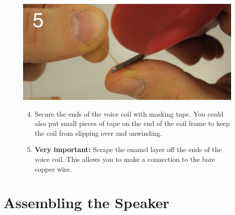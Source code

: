 \documentclass[11pt]{article}
\begin{document}
\begin{figure}[H]
	\begin{minipage}[b]{0.6\linewidth}
		\centering	\includegraphics[width=\textwidth]{images/scrape.pdf}
	\end{minipage}
	\hspace{0.1cm}
	\begin{minipage}[b]{0.45\linewidth}
		\begin{enumerate} \setcounter{enumi}{3}
			\item Secure the ends of the voice coil with masking tape. You could also put small pieces of tape on the end of the coil 					frame to keep the coil from slipping over and unwinding.
			\item {\bf Very important:} Scrape the enamel layer off the ends of the voice coil. This allows you to make a connection to 				the bare copper wire.
		\end{enumerate}
	\end{minipage}
\end{figure}

\newpage

\section*{Assembling the Speaker}			%
\end{document}
